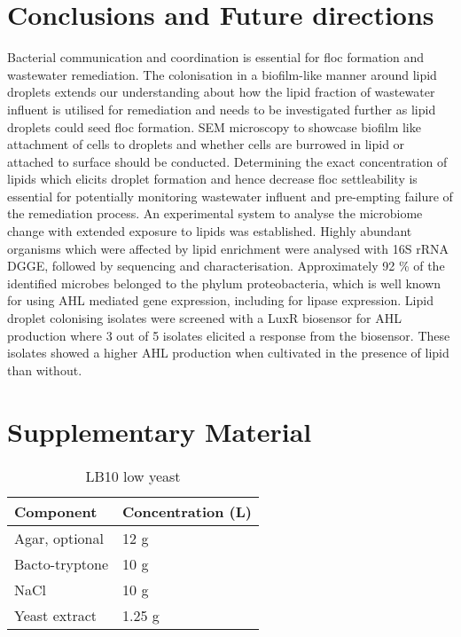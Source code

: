 \documentclass[11pt]{article}
\begin{document}
\section{Conclusions and Future directions}
Bacterial communication and coordination is essential for floc formation and wastewater remediation. The colonisation in a biofilm-like manner around lipid droplets extends our understanding about how the lipid fraction of wastewater influent is utilised for remediation and needs to be investigated further as lipid droplets could seed floc formation. SEM microscopy to showcase biofilm like attachment of cells to droplets and whether cells are burrowed in lipid or attached to surface should be conducted. Determining the exact concentration of lipids which elicits droplet formation and hence decrease floc settleability is essential for potentially monitoring wastewater influent and pre-empting failure of the remediation process. An experimental system to analyse the microbiome change with extended exposure to lipids was established. Highly abundant organisms which were affected by lipid enrichment were analysed with 16S rRNA DGGE, followed by sequencing and characterisation. Approximately 92 \% of the identified microbes belonged to the phylum proteobacteria, which is well known for using AHL mediated gene expression, including for lipase expression. Lipid droplet colonising isolates were screened with a LuxR biosensor for AHL production where 3 out of 5 isolates elicited a response from the biosensor. These isolates showed a higher AHL production when cultivated in the presence of lipid than without.
\newpage 



\newpage 
\FloatBarrier
\section{Supplementary Material}

\begin{table}
\caption{LB10 low yeast}
\begin{tabular}{  p{6.9cm} | p{6.9cm} }
\hline
Component & Concentration (L) \\
\hline
 Agar, optional & 12 g  \\
Bacto-tryptone    & 10 g  \\
   NaCl   & 10 g  \\
    Yeast extract    & 1.25 g \\
  \hline
\end{tabular}
\end{table}
\end{document}
